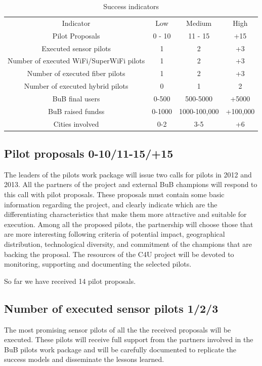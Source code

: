 \documentclass[draftclsnofoot,12pt,journal,onecolumn]{IEEEtran}
\begin{document}
\begin{table}[!t]
\renewcommand{\arraystretch}{1.3}
\caption{Success indicators}
\label{tab:indicators}
\centering
\begin{tabular}{|c|c|c|c|}
\hline
Indicator & Low & Medium & High \\
Pilot Proposals & 0 - 10 & 11 - 15 & +15 \\
Executed sensor pilots & 1 & 2 & +3 \\
Number of executed WiFi/SuperWiFi pilots& 1 & 2 & +3 \\
Number of executed fiber pilots& 1 & 2 & +3 \\
Number of executed hybrid pilots& 0 & 1 & 2 \\
BuB final users & 0-500 & 500-5000 & +5000 \\
BuB raised fundss & 0-1000 & 1000-100,000& +100,000 \\
Cities involved & 0-2 & 3-5 & +6 \\
\hline
\hline
\end{tabular}
\end{table}


\subsection{Pilot proposals 0-10/11-15/+15}

The leaders of the pilots work package will issue two calls for pilots
in 2012 and 2013. All the partners of the project and external BuB
champions will respond to this call with pilot proposals. These
proposals must contain some basic information regarding the project,
and clearly indicate which are the differentiating characteristics
that make them more attractive and suitable for execution. Among all
the proposed pilots, the partnership will choose those that are more
interesting following criteria of potential impact, geographical
distribution, technological diversity, and commitment of the champions
that are backing the proposal. The resources of the C4U project will
be devoted to monitoring, supporting and documenting the selected
pilots.

So far we have received 14 pilot proposals.

\subsection{Number of executed sensor pilots 1/2/3}
The most promising sensor pilots of all the the received proposals
will be executed. These pilots will receive full support from the
partners involved in the BuB pilots work package and will be carefully
documented to replicate the success models and disseminate the lessons
learned.
\end{document}
